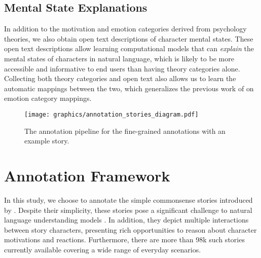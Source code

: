\documentclass[11pt,a4paper]{article}
\begin{document}
\subsection{Mental State Explanations}
In addition to the motivation and emotion categories derived from psychology theories, we also obtain open text descriptions of character mental states. These open text descriptions 
allow learning computational models that can \emph{explain} the mental states of characters in natural language, which is likely to be more accessible and informative to end users than having theory categories alone. Collecting both theory categories and open text also allows us to learn the automatic mappings between the two, which  generalizes the previous work of \citet{MohammadEmoLex} on emotion category mappings. 



 


\begin{figure*}[tb]
    \centering
    \texttt{[image: graphics/annotation\_stories\_diagram.pdf]}
    \vspace*{-3mm}
    \caption{The annotation pipeline for the fine-grained annotations with an example story.}
    \vspace*{-1mm}
    \label{pipeline:diagram}
\end{figure*}

\section{Annotation Framework}
\label{sec:data}
In this study, we choose to annotate the simple commonsense stories introduced by \citet{Mostafazadeh2016-ei}. Despite their simplicity, these stories pose a significant challenge to natural language understanding models \cite{SharedTask}. In addition, they depict multiple interactions between story characters, presenting rich opportunities to reason about character motivations and reactions. Furthermore, there are more than 98k such stories currently available covering a wide range of everyday scenarios.\vspace{-1mm}
\end{document}
